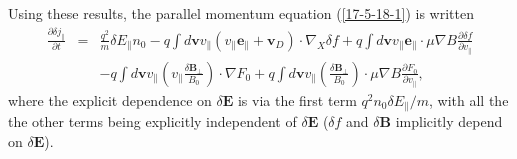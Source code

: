 \documentclass{llncs}
\begin{document}
Using these results, the parallel momentum equation (\ref{17-5-18-1}) is
written
\begin{eqnarray}
  \frac{\partial \delta j_{\parallel}}{\partial t} & = & \frac{q^2}{m} \delta
  E_{\parallel} n_0 - q \int d\mathbf{v}v_{\parallel} (v_{\parallel}
  \mathbf{e}_{\parallel} +\mathbf{v}_D) \cdot \nabla_X \delta f + q \int
  d\mathbf{v}v_{\parallel} \mathbf{e}_{\parallel} \cdot \mu \nabla B
  \frac{\partial \delta f}{\partial v_{\parallel}} \nonumber\\
  &  & - q \int d\mathbf{v}v_{\parallel} \left( v_{\parallel} \frac{\delta
  \mathbf{B}_{\perp}}{B_0} \right) \cdot \nabla F_0 + q \int
  d\mathbf{v}v_{\parallel} \left( \frac{\delta \mathbf{B}_{\perp}}{B_0}
  \right) \cdot \mu \nabla B \frac{\partial F_0}{\partial v_{\parallel}}, 
  \label{17-5-18-p3}
\end{eqnarray}
where the explicit dependence on $\delta \mathbf{E}$ is via the first term
$q^2 n_0 \delta E_{\parallel} / m$, with all the the other terms being
explicitly independent of $\delta \mathbf{E}$ ($\delta f$ and $\delta
\mathbf{B}$ implicitly depend on $\delta \mathbf{E}$).
\end{document}

